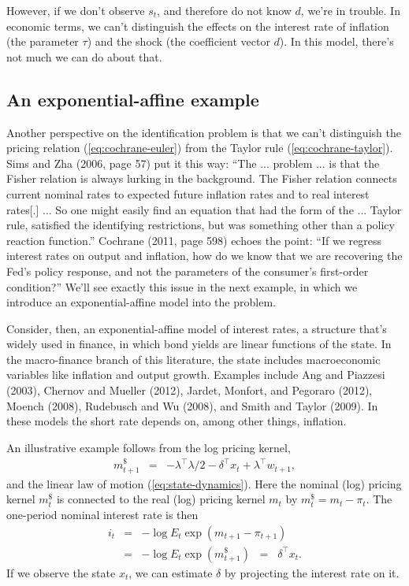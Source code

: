 \documentclass[11pt]{article}
\begin{document}
{However, if we don't observe $s_t$, and therefore do not know $d$, we're in trouble.
In economic terms,
we can't distinguish the effects on the interest rate
of inflation (the parameter $\tau$) and the shock (the coefficient vector $d$).
In this model, there's not much we can do about that.


\subsection{An exponential-affine example}
\label{sec:example-affine}

Another perspective on the identification problem
is that we can't distinguish the pricing relation (\ref{eq:cochrane-euler})
from the Taylor rule (\ref{eq:cochrane-taylor}).
Sims and Zha (2006, page 57) put it this way:
``The ... problem ...  is that the
Fisher relation is always lurking in the background.
The Fisher relation connects current nominal rates to expected future inflation rates
and to real interest rates[.] ...
So one might easily find an equation that had the form of the ... Taylor rule,
satisfied the identifying restrictions, but was something other than a policy reaction function.''
Cochrane (2011, page 598) echoes the point:
``If we regress interest rates on output and inflation, how do we know
that we are recovering the Fed's policy response, and not the parameters
of the consumer's first-order condition?''
We'll see exactly this issue in the next example,
in which we introduce an exponential-affine model into the problem.


Consider, then, an exponential-affine model of interest rates,
a structure that's widely used in finance,
in which bond yields are linear functions of the state.
In the macro-finance branch of this literature,
the state includes macroeconomic variables like inflation and output growth.
Examples include
Ang and Piazzesi (2003),
Chernov and Mueller (2012),
Jardet, Monfort, and Pegoraro (2012),
Moench (2008),
Rudebusch and Wu (2008),
and Smith and Taylor (2009).
In these models the short rate depends on,
among other things, inflation.

An illustrative example follows from the log pricing kernel,
\begin{eqnarray}
    m^{\$}_{t+1} &=& - \lambda^\top \lambda/2 - \delta^\top x_{t} + \lambda^\top w_{t+1} ,
    \label{eq:example2-logm}
\end{eqnarray}
and the linear law of motion (\ref{eq:state-dynamics}).
Here the nominal (log) pricing kernel $m^{\$}_{t}$ is
connected to the real (log) pricing kernel $m_{t}$
by $m^{\$}_t = m_t  - {\pi_t} $.
The one-period nominal interest rate is then
\begin{eqnarray}
     i_t &=& - \log E_t \exp( m_{t+1}-\pi_{t+1})
        \label{eq:macrofin-euler} \\
        &=& - \log E_t \exp(m^{\$}_{t+1})
        \;\;=\;\; \delta^\top x_t .
        \label{eq:example2-shortrate}
\end{eqnarray}
If we observe the state $x_t$, we can estimate $\delta$
by projecting the interest rate on it.

}
\end{document}
